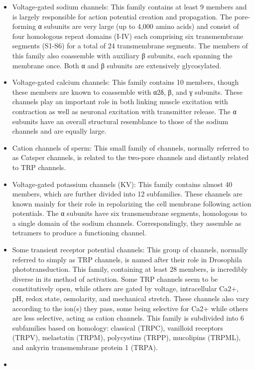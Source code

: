 \documentclass[]{book}
\providecommand{\tightlist}{%
  \setlength{\itemsep}{0pt}\setlength{\parskip}{0pt}}
\begin{document}
\begin{itemize}
\tightlist
\item
  Voltage-gated sodium channels: This family contains at least 9 members and is largely responsible for action potential creation and propagation. The pore-forming α subunits are very large (up to 4,000 amino acids) and consist of four homologous repeat domains (I-IV) each comprising six transmembrane segments (S1-S6) for a total of 24 transmembrane segments. The members of this family also coassemble with auxiliary β subunits, each spanning the membrane once. Both α and β subunits are extensively glycosylated.
\item
  Voltage-gated calcium channels: This family contains 10 members, though these members are known to coassemble with α2δ, β, and γ subunits. These channels play an important role in both linking muscle excitation with contraction as well as neuronal excitation with transmitter release. The α subunits have an overall structural resemblance to those of the sodium channels and are equally large.
\item
  Cation channels of sperm: This small family of channels, normally referred to as Catsper channels, is related to the two-pore channels and distantly related to TRP channels.
\item
  Voltage-gated potassium channels (KV): This family contains almost 40 members, which are further divided into 12 subfamilies. These channels are known mainly for their role in repolarizing the cell membrane following action potentials. The α subunits have six transmembrane segments, homologous to a single domain of the sodium channels. Correspondingly, they assemble as tetramers to produce a functioning channel.
\item
  Some transient receptor potential channels: This group of channels, normally referred to simply as TRP channels, is named after their role in Drosophila phototransduction. This family, containing at least 28 members, is incredibly diverse in its method of activation. Some TRP channels seem to be constitutively open, while others are gated by voltage, intracellular Ca2+, pH, redox state, osmolarity, and mechanical stretch. These channels also vary according to the ion(s) they pass, some being selective for Ca2+ while others are less selective, acting as cation channels. This family is subdivided into 6 subfamilies based on homology: classical (TRPC), vanilloid receptors (TRPV), melastatin (TRPM), polycystins (TRPP), mucolipins (TRPML), and ankyrin transmembrane protein 1 (TRPA).
\item

\end{itemize}
\end{document}
